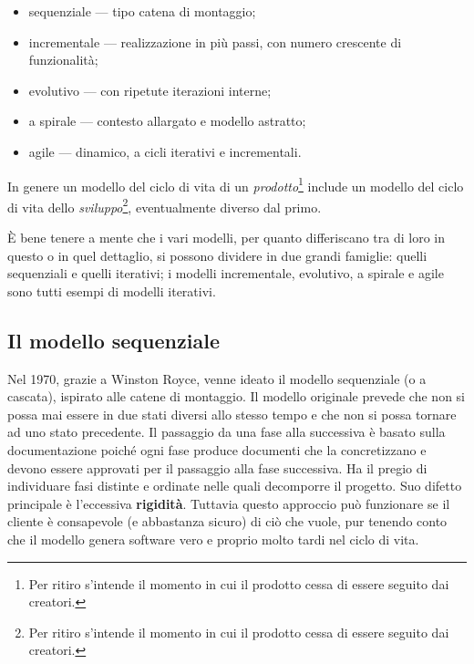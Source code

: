 \documentclass[a4paper]{article}
\begin{document}
	\begin{itemize}
		
			
	\item sequenziale — tipo catena di montaggio;
			
	\item incrementale — realizzazione in più passi, con numero crescente di funzionalità;
			
	\item evolutivo — con ripetute iterazioni interne;
			
	\item a spirale — contesto allargato e modello astratto;
			
	\item agile — dinamico, a cicli iterativi e incrementali.
		
	\end{itemize}

		
In genere un modello del ciclo di vita di un \emph{prodotto}\footnote{Per ritiro s'intende il momento in cui il prodotto cessa di essere seguito dai creatori.} include un modello del ciclo di vita dello \emph{sviluppo}\footnote{Per ritiro s'intende il momento in cui il prodotto cessa di essere seguito dai creatori.}, eventualmente diverso dal primo.
		
È bene tenere a mente che i vari modelli, per quanto differiscano tra di loro in questo o in quel dettaglio, si possono dividere in due grandi famiglie: quelli sequenziali e quelli iterativi; i modelli incrementale, evolutivo, a spirale e agile sono tutti esempi di modelli iterativi.

		
	\subsection{Il modello sequenziale}

		
Nel 1970, grazie a Winston Royce, venne ideato il modello sequenziale (o a cascata), ispirato alle catene di montaggio. Il modello originale prevede che non si possa mai essere in due stati diversi allo stesso tempo e che non si possa tornare ad uno stato precedente. Il passaggio da una fase alla successiva è basato sulla documentazione poiché ogni fase produce documenti che la concretizzano e devono essere approvati per il passaggio alla fase successiva. Ha il pregio di individuare fasi distinte e ordinate nelle quali decomporre il progetto. Suo difetto principale è l'eccessiva \textbf{rigidità}. Tuttavia questo approccio può funzionare se il cliente è consapevole (e abbastanza sicuro) di ciò che vuole, pur tenendo conto che il modello genera software vero e proprio molto tardi nel ciclo di vita.
		
\end{document}
